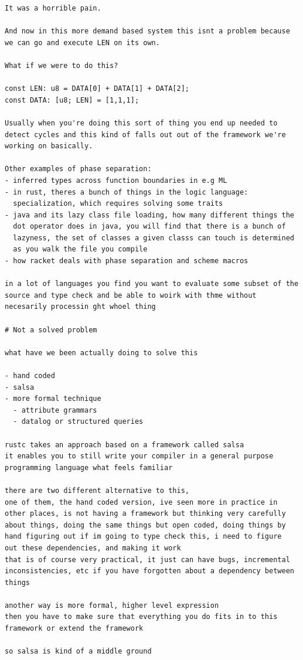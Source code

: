 \documentclass[12pt, a4paper]{report}
\begin{document}
\begin{verbatim}
It was a horrible pain.

And now in this more demand based system this isnt a problem because
we can go and execute LEN on its own.

What if we were to do this?

const LEN: u8 = DATA[0] + DATA[1] + DATA[2];
const DATA: [u8; LEN] = [1,1,1];

Usually when you're doing this sort of thing you end up needed to
detect cycles and this kind of falls out out of the framework we're
working on basically.

Other examples of phase separation:
- inferred types across function boundaries in e.g ML
- in rust, theres a bunch of things in the logic language:
  specialization, which requires solving some traits
- java and its lazy class file loading, how many different things the
  dot operator does in java, you will find that there is a bunch of
  lazyness, the set of classes a given classs can touch is determined
  as you walk the file you compile
- how racket deals with phase separation and scheme macros

in a lot of languages you find you want to evaluate some subset of the
source and type check and be able to woirk with thme without
necesarily processin ght whoel thing

# Not a solved problem

what have we been actually doing to solve this

- hand coded
- salsa
- more formal technique
  - attribute grammars
  - datalog or structured queries

rustc takes an approach based on a framework called salsa
it enables you to still write your compiler in a general purpose
programming language what feels familiar

there are two different alternative to this,
one of them, the hand coded version, ive seen more in practice in
other places, is not having a framework but thinking very carefully
about things, doing the same things but open coded, doing things by
hand figuring out if im going to type check this, i need to figure
out these dependencies, and making it work
that is of course very practical, it just can have bugs, incremental
inconsistencies, etc if you have forgotten about a dependency between
things

another way is more formal, higher level expression
then you have to make sure that everything you do fits in to this
framework or extend the framework

so salsa is kind of a middle ground


\end{verbatim}
\end{document}

